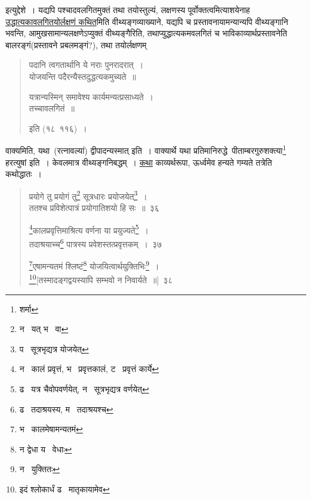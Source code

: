 \documentclass[11pt, openany]{book}
\begin{document}
\noindent
इत्युद्देशे~। यद्यपि पश्चादवलगितमुक्तं तथा तयोस्तुल्यं, लक्षणस्य पूर्वोक्तत्वमित्याशयेनाह \underline{उद्धात्यकावलगितयोर्लक्षणं कथित}मिति वीथ्यङ्गव्याख्याने, यद्यपि च प्रस्तावनायामन्यान्यपि वीथ्यङ्गानि भवन्ति, आमुखसामान्यलक्षणेऽप्युक्तं वीथ्यङ्गैरिति, तथाप्युद्धात्यकमवलगितं च भाविकाव्यार्थप्रस्तावनेति बालरङ्गं(प्रस्तावने प्रबलमङ्गं?), तथा तयोर्लक्षणम्\textendash

\begin{quote}
{\qt पदानि त्वगतार्थानि ये नराः पुनरादरात्~।\\
योजयन्ति पदैरन्यैस्तदुद्धत्यकमुच्यते~॥

यत्रान्यस्मिन् समावेश्य कार्यमन्यत्प्रसाध्यते~।\\
तच्चावलगितं~॥} इति (१८\textendash\ ११६)~। 
\end{quote}

\begin{sloppypar}
वाक्यमिति, यथा\textendash\ (रत्नावल्यां) {\qt द्वीपादन्यस्मात्} इति~। वाक्यार्थे यथा प्रतिमानिरुद्धे\textendash\ {\qt पीताम्बरगुरुशक्त्या\renewcommand{\thefootnote}{1}\footnote{शर्मा} हरत्युषां} इति~। केवलमात्र वीथ्यङ्गनिबद्धम्~। \underline{कथा} काव्यर्थरूपा, ऊर्ध्वमेव हन्यते गम्यते तत्रेति कथोद्धातः~।
\end{sloppypar}

\newpage

\begin{quote}
{\na प्रयोगे तु प्रयोगं तु\renewcommand{\thefootnote}{1}\footnote{न \textendash\ यत् भ \textendash\ वा} सूत्रधारः प्रयोजयेत्\renewcommand{\thefootnote}{2}\footnote{प \textendash\ सूत्रभृद्यत्र योजयेत्}~।\\
ततश्च प्रविशेत्पात्रं प्रयोगातिशयो हि सः~॥~३६

\renewcommand{\thefootnote}{3}\footnote{न \textendash\ कालं प्रवृत्तं, भ \textendash\ प्रवृत्तकालं, ट \textendash\ प्रवृत्तं कार्ये}कालप्रवृत्तिमाश्रित्य वर्णना या प्रयुज्यते\renewcommand{\thefootnote}{4}\footnote{ढ \textendash\ यत्र चैवोपवर्णयेत्, न \textendash\ सूत्रभृद्यत्र वर्णयेत्}~।\\
तदाश्रयाच्च\renewcommand{\thefootnote}{5}\footnote{ढ \textendash\ तदाश्रयस्य, म \textendash\ तदाश्रयश्च} पात्रस्य प्रवेशस्तत्प्रवृत्तकम्~।~३७

\renewcommand{\thefootnote}{6}\footnote{भ \textendash\ कालमेषामन्यतमं}एषामन्यतमं श्लिष्टं\renewcommand{\thefootnote}{7}\footnote{न द्वेधा य \textendash\ वेधाः} योजयित्वार्थयुक्तिभिः\renewcommand{\thefootnote}{8}\footnote{न \textendash\ युक्तितः}~।\\
\renewcommand{\thefootnote}{9}\footnote{इदं श्लोकार्धं ढ \textendash\ मातृकायामेव}[तस्मादङ्गद्वयस्यापि सम्भवो न निवार्यते~॥]~३८}
\end{quote}
\end{document}
